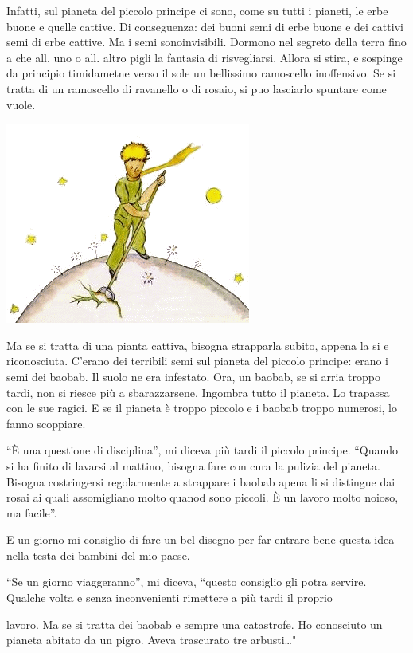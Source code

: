 \documentclass[11pt]{scrbook}
\begin{document}
Infatti, sul pianeta del piccolo principe ci sono, come su tutti i
pianeti, le erbe buone e quelle cattive. Di conseguenza: dei buoni semi
di erbe buone e dei cattivi semi di erbe cattive. Ma i semi
sonoinvisibili. Dormono nel segreto della terra fino a che all. uno o
all. altro pigli la fantasia di risvegliarsi. Allora si stira, e
sospinge da principio timidametne verso il sole un bellissimo ramoscello
inoffensivo. Se si tratta di un ramoscello di ravanello o di rosaio, si
puo lasciarlo spuntare come vuole.

\begin{center}
\includegraphics{./img/5b.png}
\end{center}

Ma se si tratta di una pianta cattiva, bisogna strapparla subito, appena
la si e riconosciuta. C'erano dei terribili semi sul pianeta del piccolo
principe: erano i semi dei baobab. Il suolo ne era infestato. Ora, un
baobab, se si arria troppo tardi, non si riesce più a sbarazzarsene.
Ingombra tutto il pianeta. Lo trapassa con le sue ragici. E se il
pianeta è troppo piccolo e i baobab troppo numerosi, lo fanno scoppiare.

``È una questione di disciplina'', mi diceva più tardi il piccolo
principe. ``Quando si ha finito di lavarsi al mattino, bisogna fare con
cura la pulizia del pianeta. Bisogna costringersi regolarmente a
strappare i baobab apena li si distingue dai rosai ai quali assomigliano
molto quanod sono piccoli. È un lavoro molto noioso, ma facile''.

E un giorno mi consiglio di fare un bel disegno per far entrare bene
questa idea nella testa dei bambini del mio paese.

``Se un giorno viaggeranno'', mi diceva, ``questo consiglio gli potra
servire. Qualche volta e senza inconvenienti rimettere a più tardi il
proprio

lavoro. Ma se si tratta dei baobab e sempre una catastrofe. Ho
conosciuto un pianeta abitato da un pigro. Aveva trascurato tre
arbusti\ldots{}"
\end{document}
